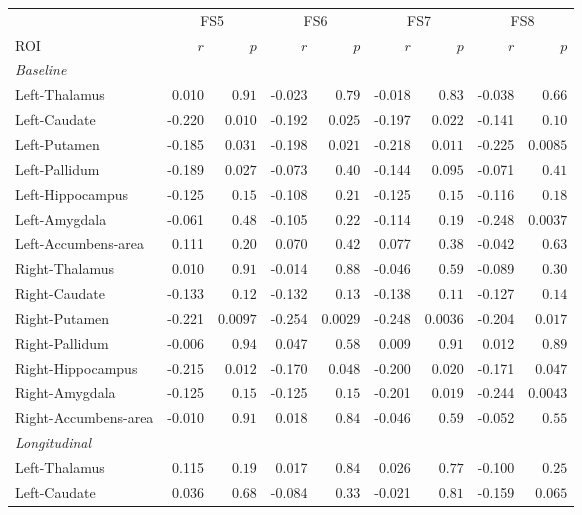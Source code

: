 \begin{tabular}{lrrrrrrrr}
\toprule
 & \multicolumn{2}{c}{FS5} & \multicolumn{2}{c}{FS6} & \multicolumn{2}{c}{FS7} & \multicolumn{2}{c}{FS8} \\
\cmidrule(lr){2-3}\cmidrule(lr){4-5}\cmidrule(lr){6-7}\cmidrule(lr){8-9}
ROI & $r$ & $p$ & $r$ & $p$ & $r$ & $p$ & $r$ & $p$ \\
\midrule
\multicolumn{9}{l}{\textit{Baseline}} \\
Left-Thalamus & 0.010 & $0.91$ & -0.023 & $0.79$ & -0.018 & $0.83$ & -0.038 & $0.66$ \\
Left-Caudate & -0.220 & $0.010$ & -0.192 & $0.025$ & -0.197 & $0.022$ & -0.141 & $0.10$ \\
Left-Putamen & -0.185 & $0.031$ & -0.198 & $0.021$ & -0.218 & $0.011$ & -0.225 & $0.0085$ \\
Left-Pallidum & -0.189 & $0.027$ & -0.073 & $0.40$ & -0.144 & $0.095$ & -0.071 & $0.41$ \\
Left-Hippocampus & -0.125 & $0.15$ & -0.108 & $0.21$ & -0.125 & $0.15$ & -0.116 & $0.18$ \\
Left-Amygdala & -0.061 & $0.48$ & -0.105 & $0.22$ & -0.114 & $0.19$ & -0.248 & $0.0037$ \\
Left-Accumbens-area & 0.111 & $0.20$ & 0.070 & $0.42$ & 0.077 & $0.38$ & -0.042 & $0.63$ \\
Right-Thalamus & 0.010 & $0.91$ & -0.014 & $0.88$ & -0.046 & $0.59$ & -0.089 & $0.30$ \\
Right-Caudate & -0.133 & $0.12$ & -0.132 & $0.13$ & -0.138 & $0.11$ & -0.127 & $0.14$ \\
Right-Putamen & -0.221 & $0.0097$ & -0.254 & $\mathbf{0.0029}$ & -0.248 & $0.0036$ & -0.204 & $0.017$ \\
Right-Pallidum & -0.006 & $0.94$ & 0.047 & $0.58$ & 0.009 & $0.91$ & 0.012 & $0.89$ \\
Right-Hippocampus & -0.215 & $0.012$ & -0.170 & $0.048$ & -0.200 & $0.020$ & -0.171 & $0.047$ \\
Right-Amygdala & -0.125 & $0.15$ & -0.125 & $0.15$ & -0.201 & $0.019$ & -0.244 & $0.0043$ \\
Right-Accumbens-area & -0.010 & $0.91$ & 0.018 & $0.84$ & -0.046 & $0.59$ & -0.052 & $0.55$ \\
\midrule
\multicolumn{9}{l}{\textit{Longitudinal}} \\
Left-Thalamus & 0.115 & $0.19$ & 0.017 & $0.84$ & 0.026 & $0.77$ & -0.100 & $0.25$ \\
Left-Caudate & 0.036 & $0.68$ & -0.084 & $0.33$ & -0.021 & $0.81$ & -0.159 & $0.065$ \\

\end{tabular}
